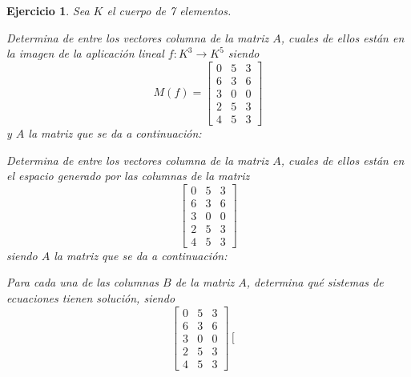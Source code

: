 \documentclass[12pt]{amsart}
\newtheorem{ejer}{Ejercicio}
\begin{document}
\begin{ejer} Sea $K$ el cuerpo de 7 elementos.
\newline
\noindent\begin{minipage}{\textwidth}
\begin{tcolorbox}[colback = green!20!white,title=Versión Núcleo]
Determina de entre los vectores columna de la matriz $A$, cuales de ellos están en la imagen de la aplicación lineal $f:K^{3} \to K^{5}$ siendo  $$ M(f) = \left[\begin{array}{rrr}
0 & 5 & 3 \\
6 & 3 & 6 \\
3 & 0 & 0 \\
2 & 5 & 3 \\
4 & 5 & 3
\end{array}\right] $$ y $A$ la matriz que se da a continuación:\end{tcolorbox}
\end{minipage} \newline
\noindent\begin{minipage}{\textwidth}
\begin{tcolorbox}[colback = blue!20!white,title=Versión Anulador]
Determina de entre los vectores columna de la matriz $A$, cuales de ellos están en el espacio generado por las columnas de la matriz $$ \left[\begin{array}{rrr}
0 & 5 & 3 \\
6 & 3 & 6 \\
3 & 0 & 0 \\
2 & 5 & 3 \\
4 & 5 & 3
\end{array}\right] $$ siendo $A$ la matriz que se da a continuación:\end{tcolorbox}
\end{minipage} \newline
\noindent\begin{minipage}{\textwidth} 
\begin{tcolorbox}[colback = red!20!white,title=Versión Ecuaciones Implícitas]
Para cada una de las columnas $B$ de la matriz $A$, determina qué sistemas de ecuaciones tienen solución, siendo $$ \left[\begin{array}{rrr}
0 & 5 & 3 \\
6 & 3 & 6 \\
3 & 0 & 0 \\
2 & 5 & 3 \\
4 & 5 & 3
\end{array}\right] \left[\begin{array}{r}

\end{array}$$
\end{tcolorbox}
\end{minipage}
\end{ejer}
\end{document}

